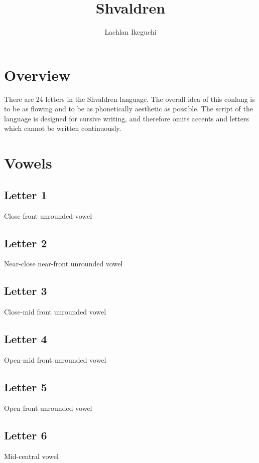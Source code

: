 \documentclass{book}
\title{Shvaldren}
\author{Lachlan Ikeguchi}
\newcommand{\letter}[1]{\begin{center}\resizebox{1cm}{!}{\texttt{[image: \#1]}}\end{center}}
\begin{document}
\maketitle
\tableofcontents

\chapter{Overview}
There are 24 letters in the Shvaldren language.  The overall idea of this conlang is to be as flowing and to be as phonetically aesthetic as possible.  The script of the language is designed for cursive writing, and therefore omits accents and letters which cannot be written continuously.


\chapter{Vowels}
\section{Letter 1}
Close front unrounded vowel

\letter{letters/vowels/1.JPG}


\section{Letter 2}
Near-close near-front unrounded vowel

\letter{letters/vowels/2.JPG}


\section{Letter 3}
Close-mid front unrounded vowel

\letter{letters/vowels/3.JPG}


\section{Letter 4}
Open-mid front unrounded vowel

\letter{letters/vowels/4.JPG}


\section{Letter 5}
Open front unrounded vowel

\letter{letters/vowels/5.JPG}


\section{Letter 6}
Mid-central vowel
\end{document}
